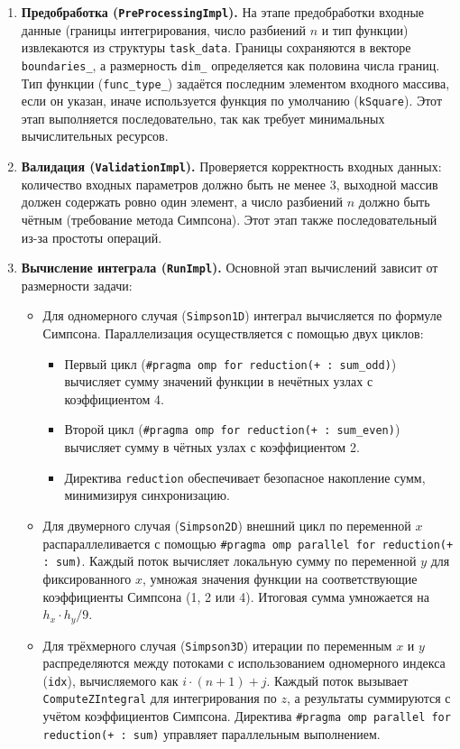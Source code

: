 \documentclass[12pt]{article}
\begin{document}
\begin{enumerate}
  \item \textbf{Предобработка (\texttt{PreProcessingImpl}).}
  На этапе предобработки входные данные (границы интегрирования, число разбиений $n$ и тип функции) извлекаются из структуры \texttt{task\_data}. Границы сохраняются в векторе \texttt{boundaries\_}, а размерность \texttt{dim\_} определяется как половина числа границ. Тип функции (\texttt{func\_type\_}) задаётся последним элементом входного массива, если он указан, иначе используется функция по умолчанию (\texttt{kSquare}). Этот этап выполняется последовательно, так как требует минимальных вычислительных ресурсов.

  \item \textbf{Валидация (\texttt{ValidationImpl}).}
  Проверяется корректность входных данных: количество входных параметров должно быть не менее 3, выходной массив должен содержать ровно один элемент, а число разбиений $n$ должно быть чётным (требование метода Симпсона). Этот этап также последовательный из-за простоты операций.

  \item \textbf{Вычисление интеграла (\texttt{RunImpl}).}
  Основной этап вычислений зависит от размерности задачи:
  \begin{itemize}
    \item Для одномерного случая (\texttt{Simpson1D}) интеграл вычисляется по формуле Симпсона. Параллелизация осуществляется с помощью двух циклов:
    \begin{itemize}
      \item Первый цикл (\texttt{\#pragma omp for reduction(+ : sum\_odd)}) вычисляет сумму значений функции в нечётных узлах с коэффициентом 4.
      \item Второй цикл (\texttt{\#pragma omp for reduction(+ : sum\_even)}) вычисляет сумму в чётных узлах с коэффициентом 2.
      \item Директива \texttt{reduction} обеспечивает безопасное накопление сумм, минимизируя синхронизацию.
    \end{itemize}
    \item Для двумерного случая (\texttt{Simpson2D}) внешний цикл по переменной $x$ распараллеливается с помощью \texttt{\#pragma omp parallel for reduction(+ : sum)}. Каждый поток вычисляет локальную сумму по переменной $y$ для фиксированного $x$, умножая значения функции на соответствующие коэффициенты Симпсона (1, 2 или 4). Итоговая сумма умножается на $h_x \cdot h_y / 9$.
    \item Для трёхмерного случая (\texttt{Simpson3D}) итерации по переменным $x$ и $y$ распределяются между потоками с использованием одномерного индекса (\texttt{idx}), вычисляемого как $i \cdot (n + 1) + j$. Каждый поток вызывает \texttt{ComputeZIntegral} для интегрирования по $z$, а результаты суммируются с учётом коэффициентов Симпсона. Директива \texttt{\#pragma omp parallel for reduction(+ : sum)} управляет параллельным выполнением.
  \end{itemize}


\end{enumerate}
\end{document}
